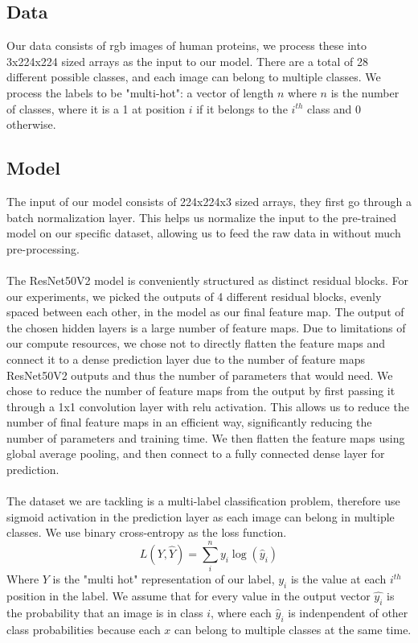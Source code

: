 \documentclass{article}
\begin{document}
\subsection{Data}
Our data consists of rgb images of human proteins, we process these into 3x224x224 sized
arrays as the input to our model. There are a total of 28 different possible classes,
and each image can belong to multiple classes. We process the labels to be "multi-hot":
a vector of length $n$ where $n$ is the number of classes, where it is a 1 at position $i$ if it belongs to the $i^{th}$ class and 0 otherwise.
\subsection{Model}

The input of our model consists of 224x224x3 sized arrays, they first go through a batch normalization layer\cite{ioffe2015batch}. This helps
us normalize the input to the pre-trained model on our specific dataset, allowing us 
to feed the raw data in without much pre-processing.
\\
\\
The ResNet50V2 model is conveniently structured as distinct residual blocks.
For our experiments, we picked the outputs of 4 different residual blocks, evenly spaced between each other, in the model
as our final feature map. The output of the chosen hidden layers is a large number of feature maps. Due to limitations of our compute resources, we chose not to directly flatten the feature maps and connect it to a dense prediction
layer due to the number of feature maps ResNet50V2 outputs and thus the number of parameters that would need. We chose to reduce the number of feature maps from the output by first passing it through a 1x1 convolution layer\cite{szegedy2014going} with 
relu activation. This allows us to reduce the number of final feature maps in an efficient way, significantly reducing the number of parameters and training time. 
We then flatten the feature maps using global average pooling\cite{Lin2013NetworkIN}, and then connect to a 
fully connected dense layer for prediction. 
\\
\\
The dataset we are tackling is a multi-label classification problem, therefore use sigmoid activation
in the prediction layer as each image can belong in multiple classes. We use binary cross-entropy as the loss function. 
\begin{equation}
    L(Y, \hat{Y}) = \sum_i^n y_i\log{(\hat{y}_i)}
\end{equation}
Where $Y$ is the "multi hot" representation of our label, $y_i$
is the value at each $i^{th}$ position in the label.  We assume that for every value in the output vector $\hat{y_i}$ is the probability
that an image is in class $i$, where each $\hat{y}_i$ is indenpendent of other class probabilities because 
each $x$ can belong to multiple classes at the same time. 
\end{document}
